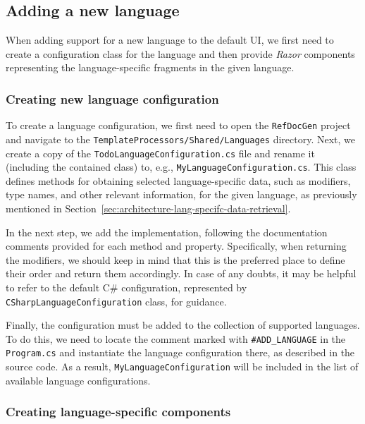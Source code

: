 \subsection{Adding a new language}
\label{sec:extensibility-new-lang}

When adding support for a new language to the default UI, we first need to create a configuration class for the language and then provide \textit{Razor} components representing the language-specific fragments in the given language.

\subsubsection{Creating new language configuration}

To create a language configuration, we first need to open the \texttt{RefDocGen} project and navigate to the \texttt{TemplateProcessors/Shared/Languages} directory.
Next, we create a copy of the \texttt{TodoLanguageConfiguration.cs} file and rename it (including the contained class) to, e.g., \texttt{MyLanguageConfiguration.cs}.
This class defines methods for obtaining selected language-specific data, such as modifiers, type names, 
and other relevant information, for the given language, as previously mentioned in Section~\ref{sec:architecture-lang-specifc-data-retrieval}.

In the next step, we add the implementation, following the documentation comments provided for each method and property.
Specifically, when returning the modifiers, we should keep in mind that this is the preferred place to define their order and return them accordingly.
In case of any doubts, it may be helpful to refer to the default C\# configuration, represented by \texttt{CSharpLanguageConfiguration} class, for guidance.

Finally, the configuration must be added to the collection of supported languages.
To do this, we need to locate the comment marked with \texttt{\#ADD\_LANGUAGE} in the \texttt{Program.cs} and instantiate the language configuration there, as described in the source code.
As a result, \texttt{MyLanguageConfiguration} will be included in the list of available language configurations.

\subsubsection{Creating language-specific components}

